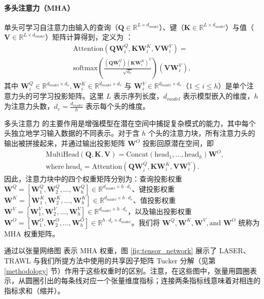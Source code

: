 \paragraph{多头注意力（MHA）}

单头可学习自注意力由输入的查询（$\mathbf{Q} \in \mathbb{R}^{L \times d_{model}}$）、键（$\mathbf{K} \in \mathbb{R}^{L \times d_{model}}$）与值（$\mathbf{V} \in \mathbb{R}^{L \times d_{model}}$）矩阵计算得到，定义为 \cite{vaswani2017attention}：
\begin{multline} 
    \text{Attention}(\mathbf{Q}\mathbf{W}^Q_i, \mathbf{K}\mathbf{W}^K_i, \mathbf{V}\mathbf{W}^V_i) = \\ 
\text{softmax}\left(\frac{\left(\mathbf{Q}\mathbf{W}^Q_i \right) \left(\mathbf{K}\mathbf{W}^K_i \right)^T}{\sqrt{d_{v}}}\right) \left(\mathbf{V}\mathbf{W}^V_i \right),
\label{eq:self_attention} 
\end{multline}
其中 $\mathbf{W}^Q_i \in \mathbb{R}^{d_{model} \times d_{v}}, \mathbf{W}^K_i \in \mathbb{R}^{d_{model} \times d_{v}}$ 与 $\mathbf{W}^V_i \in \mathbb{R}^{d_{model} \times d_{v}}$（$1\leq i \leq h$）是单个注意力头的可学习投影矩阵。这里 $L$ 表示序列长度，$d_{model}$ 表示模型嵌入的维度，$h$ 为注意力头数，$d_v = \frac{d_{model}}{h}$ 表示每个头的维度。

多头注意力 \cite{vaswani2017attention} 的主要作用是增强模型在潜在空间中捕捉复杂模式的能力，其中每个头独立地学习输入数据的不同表示。对于含 $h$ 个头的注意力块，所有注意力头的输出被拼接起来，并通过输出投影矩阵 $\mathbf{W}^O$ 投影回原潜在空间，即
\begin{equation}
\begin{split}
   & \text{MultiHead}(\mathbf{Q}, \mathbf{K}, \mathbf{V}) = \text{Concat}(\text{head}_1, \ldots, \text{head}_h) \mathbf{W}^O, \\
 & \text{where} \  \text{head}_i = \text{Attention}(\mathbf{Q}\mathbf{W}^Q_i, \mathbf{K}\mathbf{W}^K_i, \mathbf{V}\mathbf{W}^V_i).
\end{split}
\label{eq:MHA}
\end{equation}
因此，注意力块中的四个权重矩阵分别为：查询投影权重 $\mathbf{W}^Q = \left[\mathbf{W}^Q_1, \mathbf{W}^Q_2, \ldots, \mathbf{W}^Q_h \right] \in \mathbb{R}^{d_{model} \times h \cdot d_v}$、键投影权重 $\mathbf{W}^K = \left[\mathbf{W}^K_1, \mathbf{W}^K_2, \ldots, \mathbf{W}^K_h \right] \in \mathbb{R}^{d_{model} \times h \cdot d_v}$、值投影权重 $\mathbf{W}^V = \left[\mathbf{W}^V_1, \mathbf{W}^V_2, \ldots, \mathbf{W}^V_h \right] \in \mathbb{R}^{d_{model} \times h \cdot d_v}$，以及输出投影权重 $\mathbf{W}^{O} = \left[\mathbf{W}^O_1, \mathbf{W}^O_2, \ldots, \mathbf{W}^O_h \right] \in \mathbb{R}^{h \cdot d_v \times d_{model}}$。我们将 $\mathbf{W}^Q, \mathbf{W}^K, \mathbf{W}^V, \text{and } \mathbf{W}^O$ 统称为 MHA 权重矩阵。\par
通过以张量网络图 \cite{orus2014practical} 表示 MHA 权重，图 \ref{fig:tensor_network} 展示了 LASER、TRAWL 与我们所提方法中使用的共享因子矩阵 Tucker 分解（见第 \ref{methodology} 节）作用于这些权重时的区别。注意，在这些图中，张量用圆圈表示，从圆圈引出的每条线对应一个张量维度指标；连接两条指标线意味着对相连的指标求和（缩并）。

